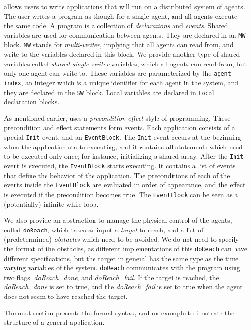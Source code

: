\rolang allows users to write applications that will run on a distributed system of agents. The user writes a program as though for a single agent, and all agents execute the same code. A \rolang program is a collection of \emph{declarations} and \emph{events}. Shared variables are used for communication between agents. They are declared in an \verb|MW| block. \verb|MW| stands for \emph{multi-writer}, implying that all agents can read from, and write to the variables declared in this block. We provide another type of shared variables called \emph{shared single-writer} variables, which all agents can read from, but only one agent can write to. These variables are parameterized by the \verb|agent index|, an integer which is a unique identifier for each agent in the system, and they are declared in the \verb|SW| block. Local variables are declared in \verb|Loc|al declaration blocks.  \newline

As mentioned earlier, \rolang uses a \emph{precondition-effect} style of programming. These precondition and effect statements form events. Each application consists of a special \verb|Init| event, and an \verb|EventBlock|. The \verb|Init| event occurs at the beginning when the application starts executing, and it contains all statements which need to be executed only once; for instance, initializing a shared array. After the \verb|Init| event is executed, the \verb|EventBlock| starts executing. It contains a list of events that define the behavior of the application. The preconditions of each of the events inside the \verb|EventBlock| are evaluated in order of appearance, and the effect is executed if the precondition becomes true. The \verb|EventBlock| can be seen as a (potentially) infinite while-loop. 

We also provide an abstraction to manage the physical control of the agents, called \verb|doReach|, which takes as input a \emph{target} to reach, and a list of (predetermined) \emph{obstacles} which need to be avoided. We do not need to specify the format of the obstacles, as different implementations of this \verb|doReach| can have different specifications, but the target in general has the same type as the time varying variables of the system. \verb|doReach| communicates with the program using two flags, \emph{doReach_done}, and \emph{doReach_fail}. If the target is reached, the \emph{doReach_done} is set to true, and the \emph{doReach_fail} is set to true when the agent does not seem to have reached the target.

The next section presents the formal syntax, and an example to illustrate the structure of a general application. 

